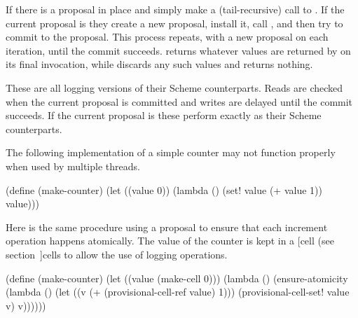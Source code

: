 \begin{protos}
\end{protos}
\noindent
If there is a proposal in place 
  and 
 simply make a (tail-recursive) call to .
If the current proposal is  they create a new proposal,
 install it, call , and then try to commit to the proposal.
This process repeats, with a new proposal on each iteration, until
 the commit succeeds.
 returns whatever values are returned by 
 on its final invocation, while  discards any such
 values and returns nothing.

\begin{protos}
\end{protos}
\noindent
These are all logging versions of their Scheme counterparts.
Reads are checked when the current proposal is committed and writes are
 delayed until the commit succeeds.
If the current proposal is  these perform exactly as their Scheme
 counterparts.

The following implementation of a simple counter may not function properly
 when used by multiple threads.
\begin{example}
(define (make-counter)
  (let ((value 0))
    (lambda ()
      (set! value (+ value 1))
      value)))
\end{example}

Here is the same procedure using a proposal to ensure that each
 increment operation happens atomically.
The value of the counter is kept in a
 [cell (see section~\Ref]{cells}
 to allow the use of
 logging operations.
\begin{example}
(define (make-counter)
  (let ((value (make-cell 0)))
    (lambda ()
      (ensure-atomicity
        (lambda ()
          (let ((v (+ (provisional-cell-ref value)
                      1)))
            (provisional-cell-set! value v)
            v))))))
\end{example}

